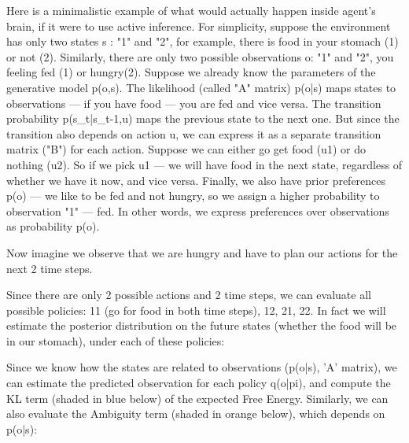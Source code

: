 \documentclass[12pt]{article}
\begin{document}

Here is a minimalistic example of what would actually happen inside agent's brain, if it were to use active inference. For simplicity, suppose the environment has only two states s : "1" and "2", for example, there is food in your stomach (1) or not (2). Similarly, there are only two possible observations o: "1" and "2", you feeling fed (1) or hungry(2). Suppose we already know the parameters of the generative model p(o,s). The likelihood (called "A" matrix) p(o|s) maps states to observations — if you have food — you are fed and vice versa. The transition probability p(s\_t|s\_t-1,u) maps the previous state to the next one. But since the transition also depends on action u, we can express it as a separate transition matrix ("B") for each action. Suppose we can either go get food (u1) or do nothing (u2). So if we pick u1 — we will have food in the next state, regardless of whether we have it now, and vice versa. Finally, we also have prior preferences p(o) — we like to be fed and not hungry, so we assign a higher probability to observation "1" — fed. In other words, we express preferences over observations as probability p(o).

Now imagine we observe that we are hungry and have to plan our actions for the next 2 time steps.

Since there are only 2 possible actions and 2 time steps, we can evaluate all possible policies: 11 (go for food in both time steps), 12, 21, 22. In fact we will estimate the posterior distribution on the future states (whether the food will be in our stomach), under each of these policies:

Since we know how the states are related to observations (p(o|s), 'A' matrix), we can estimate the predicted observation for each policy q(o|pi), and compute the KL term (shaded in blue below) of the expected Free Energy. Similarly, we can also evaluate the Ambiguity term (shaded in orange below), which depends on p(o|s):
\end{document}
